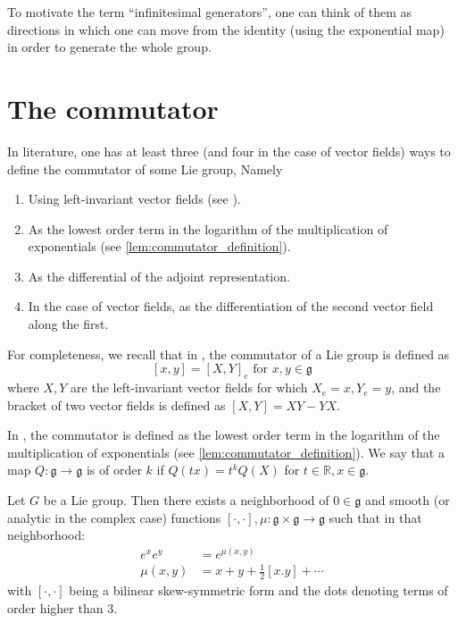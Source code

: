 \documentclass{report}
\begin{document}
\begin{remark}
    To motivate the term ``inﬁnitesimal generators'', one can think of them as directions in which one can move from the identity (using the exponential map) in order to generate the whole group.
\end{remark}

\section{The commutator}
In literature, one has at least three (and four in the case of vector fields) ways to define the commutator of some Lie group, Namely
\begin{enumerate}[label = (\roman*)]
    \item Using left-invariant vector fields (see \cite{lee2018introduction}).
    \item As the lowest order term in the logarithm of the multiplication of exponentials (see \cref{lem:commutator_definition}).
    \item As the differential of the adjoint representation.
    \item In the case of vector fields, as the differentiation of the second vector field along the first.
\end{enumerate}

For completeness, we recall that in \cite{lee2018introduction}, the commutator of a Lie group is defined as
\[
[x,y] = [X,Y]_e \text{ for } x,y \in \mathfrak g
\]
where $X,Y$ are the left-invariant vector fields for which $X_e = x, Y_e = y$, and the bracket of two vector fields is defined as $[X,Y] = XY - YX$.

In \cite{kirillov2008introduction}, the commutator is defined as the lowest order term in the logarithm of the multiplication of exponentials (see \cref{lem:commutator_definition}).
We say that a map $Q:\mathfrak g \to \mathfrak g$ is of order $k$ if $Q(t x) = t^k Q(X)$ for $t \in \mathbb R, x \in \mathfrak g$.
\begin{lemma}\label{lem:commutator_definition}
    Let $G$ be a Lie group.
    Then there exists a neighborhood of $0 \in \mathfrak g$ and smooth (or analytic in the complex case) functions $[\cdot, \cdot], \mu: \mathfrak g \times \mathfrak g \to \mathfrak g$ such that in that neighborhood:
    \begin{align*}
        e^x e^y &= e^{\mu(x,y)}\\
        \mu(x,y) &= x + y + \frac{1}{2}[x.y] + \cdots
    \end{align*}
    with $[\cdot, \cdot]$ being a bilinear skew-symmetric form and the dots denoting terms of order higher than $3$.
\end{lemma}
\end{document}
